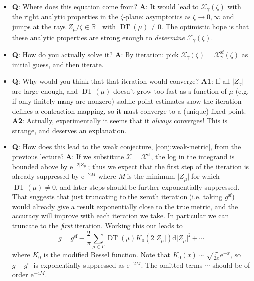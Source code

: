 \documentclass[12pt,letterpaper,reqno]{article}
\numberwithin{equation}{section}
\begin{document}
\begin{itemize}
  \item {\bf Q}: Where does this equation come from? {\bf A}: It would lead to $\mathcal X_\gamma(\zeta)$ with
  the right analytic properties in the $\zeta$-plane: asymptotics as $\zeta \to 0,\infty$
  and jumps at the rays $Z_\mu / \zeta \in \mathbb R_-$ with $\operatorname{DT}(\mu) \neq 0$.
  The optimistic hope is that these analytic properties are strong enough
  to \textit{determine} $\mathcal X_\gamma(\zeta)$.

  \item {\bf Q}: How do you actually solve it? {\bf A}: By iteration: pick
  $\mathcal X_\gamma(\zeta) = \mathcal X_\gamma^{\mathrm{sf}}(\zeta)$ as initial guess, 
  and then iterate.

  \item {\bf Q}: Why would you think that that iteration would converge?
  {\bf A1}: If all $\lvert Z_\gamma \rvert$ are large enough, and $\operatorname{DT}(\mu)$ doesn't grow too fast
  as a function of $\mu$ (e.g. if only finitely many are nonzero)
  saddle-point estimates show 
  the iteration defines a contraction mapping, so it must
  converge to a (unique) fixed point.
  {\bf A2}: Actually, experimentally it seems that
  it \textit{always} converges! This is strange, and
  deserves an explanation.

  \item {\bf Q}: How does this lead to the weak
  conjecture, \autoref{conj:weak-metric}, from the previous lecture? {\bf A}: 
  If we substitute $\mathcal X = \mathcal X^{\mathrm{sf}}$, the log in the
  integrand is bounded above by $\mathrm e^{-2 \lvert Z_\mu \rvert}$;
  thus we expect that the first step of the iteration is already
  suppressed by $\mathrm e^{-2 M}$ where $M$ is the minimum $\lvert Z_\mu \rvert$
  for which $\operatorname{DT}(\mu) \neq 0$, and later steps
  should be further exponentially suppressed. That suggests
  that just truncating to the zeroth iteration (i.e. taking $g^{\mathrm{sf}}$)
  would already give a result exponentially close to the true metric,
  and the accuracy will improve with each iteration we take.
  In particular we can truncate to the \textit{first} iteration.
  Working this out leads to
  \begin{equation}
    g = g^{\mathrm{sf}} - \frac{2}{\pi} \sum_{\mu \in \Gamma} \operatorname{DT}(\mu) K_0\left( 2 \lvert Z_\mu \rvert \right) \mathrm{d} \lvert Z_\mu \rvert^2 + \cdots
  \end{equation}
  where $K_0$ is the modified Bessel function.
  Note that $K_0(x) \sim \sqrt{\frac{\pi}{2x}} \mathrm e^{-x}$,
  so $g - g^{\mathrm{sf}}$ is exponentially suppressed as $\mathrm e^{-2M}$.
  The omitted terms $\cdots$ should be of order $\mathrm e^{-4M}$.
\end{itemize}
\end{document}
